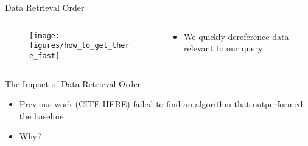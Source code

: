 \begin{frame}{Data Retrieval Order}
    \begin{columns}[T] %
        \begin{column}{.48\textwidth}

       \begin{figure}
            \centering
            \texttt{[image: figures/how\_to\_get\_there\_fast]}
        \end{figure}

        \end{column}%
        \hfill%
        \begin{column}{.48\textwidth}
            \bigskip
            \begin{itemize}
                \item We quickly dereference data relevant to our query
            \end{itemize}
        \end{column}%
    \end{columns}
\end{frame}


\begin{frame}{The Impact of Data Retrieval Order}
    \begin{itemize}
        \item Previous work (CITE HERE) failed to find an algorithm that outperformed the baseline
        \item Why?
    \end{itemize}
\end{frame}
